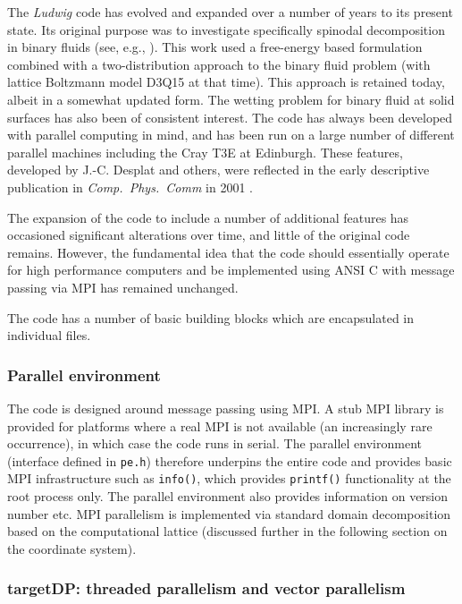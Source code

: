 The \textit{Ludwig} code has evolved and expanded over a number of
years to its present state. Its original purpose was to investigate
specifically spinodal decomposition in binary fluids (see, e.g.,
\cite{kendon2001}). This work used a free-energy based formulation
combined with a two-distribution approach to the binary fluid problem
(with lattice Boltzmann model D3Q15 at that time). This approach  is
retained today, albeit in a somewhat updated form. The wetting problem
for binary fluid at solid surfaces has also been of consistent interest.
The code has always been developed with
parallel computing in mind, and has been run on a large number of
different parallel machines including the Cray T3E at Edinburgh. These
features, developed by J.-C. Desplat and others,  were reflected in the
early descriptive publication in \textit{Comp.\ Phys.\ Comm} in 2001
\cite{desplat2001}. 

The expansion of the code to include a number of additional features
has occasioned significant alterations over time, and little of the
original code remains. However, the fundamental idea that the code
should essentially operate for high performance computers and be
implemented using ANSI C with message passing via MPI has remained
unchanged.

The code has a number of basic building blocks which are encapsulated
in individual files.

\subsubsection{Parallel environment}

The code is designed around message passing using MPI. A stub MPI
library is provided for platforms where a real MPI is not available
(an increasingly rare occurrence), in which case the code runs in
serial. The parallel environment (interface defined in \texttt{pe.h})
therefore underpins
the entire code and provides basic MPI infrastructure such as
\texttt{info()},
which provides \texttt{printf()} functionality at the root process
only. The parallel environment also provides information on version
number etc. MPI parallelism is implemented via standard domain
decomposition based on the computational lattice (discussed
further in the following section on the coordinate system).

\subsubsection{targetDP: threaded parallelism and vector parallelism}

